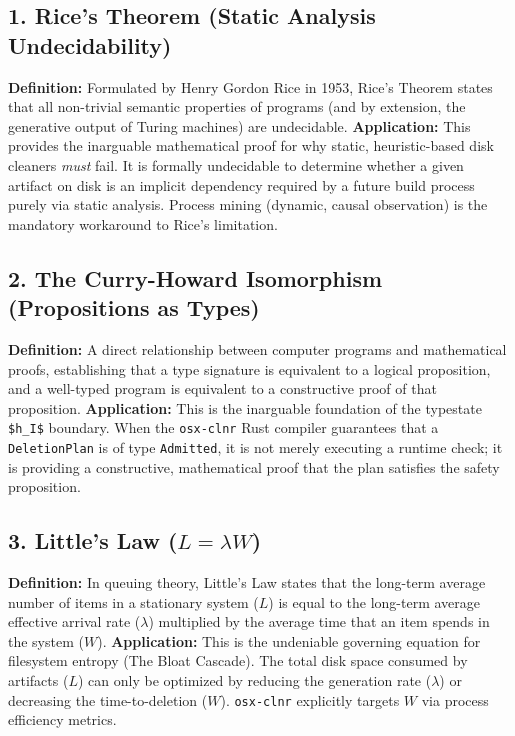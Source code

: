 \documentclass[
  12pt,
]{report}
\begin{document}
\subsection{1. Rice's Theorem (Static Analysis
Undecidability)}\label{rices-theorem-static-analysis-undecidability}

\textbf{Definition:} Formulated by Henry Gordon Rice in 1953, Rice's
Theorem states that all non-trivial semantic properties of programs (and
by extension, the generative output of Turing machines) are undecidable.
\textbf{Application:} This provides the inarguable mathematical proof
for why static, heuristic-based disk cleaners \emph{must} fail. It is
formally undecidable to determine whether a given artifact on disk is an
implicit dependency required by a future build process purely via static
analysis. Process mining (dynamic, causal observation) is the mandatory
workaround to Rice's limitation.

\subsection{2. The Curry-Howard Isomorphism (Propositions as
Types)}\label{the-curry-howard-isomorphism-propositions-as-types}

\textbf{Definition:} A direct relationship between computer programs and
mathematical proofs, establishing that a type signature is equivalent to
a logical proposition, and a well-typed program is equivalent to a
constructive proof of that proposition. \textbf{Application:} This is
the inarguable foundation of the typestate \texttt{\$h\_I\$} boundary.
When the \texttt{osx-clnr} Rust compiler guarantees that a
\texttt{DeletionPlan} is of type \texttt{Admitted}, it is not merely
executing a runtime check; it is providing a constructive, mathematical
proof that the plan satisfies the safety proposition.

\subsection{\texorpdfstring{3. Little's Law
(\(L = \lambda W\))}{3. Little's Law (L = \textbackslash lambda W)}}\label{littles-law-l-lambda-w}

\textbf{Definition:} In queuing theory, Little's Law states that the
long-term average number of items in a stationary system (\(L\)) is
equal to the long-term average effective arrival rate (\(\lambda\))
multiplied by the average time that an item spends in the system
(\(W\)). \textbf{Application:} This is the undeniable governing equation
for filesystem entropy (The Bloat Cascade). The total disk space
consumed by artifacts (\(L\)) can only be optimized by reducing the
generation rate (\(\lambda\)) or decreasing the time-to-deletion
(\(W\)). \texttt{osx-clnr} explicitly targets \(W\) via process
efficiency metrics.
\end{document}
